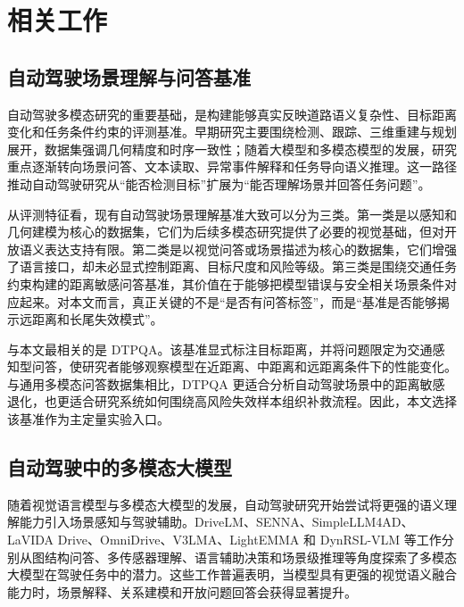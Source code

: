 
\chapter{相关工作}
\label{cha:related}

\section{自动驾驶场景理解与问答基准}
\label{sec:related-benchmark}

自动驾驶多模态研究的重要基础，是构建能够真实反映道路语义复杂性、目标距离变化和任务条件约束的评测基准。早期研究主要围绕检测、跟踪、三维重建与规划展开，数据集强调几何精度和时序一致性；随着大模型和多模态模型的发展，研究重点逐渐转向场景问答、文本读取、异常事件解释和任务导向语义推理\cite{caesar2020nuscenes,dosovitskiy2017carla,marcu2024lingoqa,tom2023readingbetweenthelanes,sima2024drivelm,ding2024holisticautonomousdriving,charoenpitaks2025tbbench,guo2024drivemllm,choudhary2023talk2bev}。这一路径推动自动驾驶研究从“能否检测目标”扩展为“能否理解场景并回答任务问题”。

从评测特征看，现有自动驾驶场景理解基准大致可以分为三类。第一类是以感知和几何建模为核心的数据集，它们为后续多模态研究提供了必要的视觉基础，但对开放语义表达支持有限。第二类是以视觉问答或场景描述为核心的数据集，它们增强了语言接口，却未必显式控制距离、目标尺度和风险等级。第三类是围绕交通任务约束构建的距离敏感问答基准，其价值在于能够把模型错误与安全相关场景条件对应起来。对本文而言，真正关键的不是“是否有问答标签”，而是“基准是否能够揭示远距离和长尾失效模式”。

与本文最相关的是 DTPQA\cite{theodoridis2025dtpqa,theodoridis2025evaluating}。该基准显式标注目标距离，并将问题限定为交通感知型问答，使研究者能够观察模型在近距离、中距离和远距离条件下的性能变化。与通用多模态问答数据集相比，DTPQA 更适合分析自动驾驶场景中的距离敏感退化，也更适合研究系统如何围绕高风险失效样本组织补救流程。因此，本文选择该基准作为主定量实验入口。

\section{自动驾驶中的多模态大模型}
\label{sec:related-advlm}

随着视觉语言模型与多模态大模型的发展，自动驾驶研究开始尝试将更强的语义理解能力引入场景感知与驾驶辅助。DriveLM、SENNA、SimpleLLM4AD、LaVIDA Drive、OmniDrive、V3LMA、LightEMMA 和 DynRSL-VLM 等工作分别从图结构问答、多传感器理解、语言辅助决策和场景级推理等角度探索了多模态大模型在驾驶任务中的潜力\cite{sima2024drivelm,jiang2024senna,zheng2024simplellm4ad,jiao2024lavidadrive,wang2024omnidrive,lubberstedt2025v3lma,qiao2025lightemma,zhou2025dynrslvlm}。这些工作普遍表明，当模型具有更强的视觉语义融合能力时，场景解释、关系建模和开放问题回答会获得显著提升。

